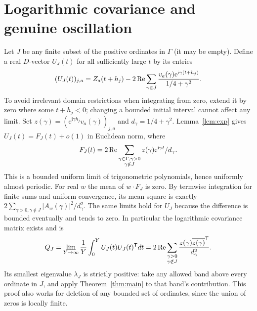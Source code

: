 \documentclass[11pt]{article}
\theoremstyle{remark}\newtheorem{remark}[theorem]{Remark}
\newcommand{\ii}{\mathrm i}\newcommand{\e}{\mathrm e}\newcommand{\ph}{\varphi}
\begin{document}
\section{Logarithmic covariance and genuine oscillation}
Let $J$ be any finite subset of the positive ordinates in $\Gamma$ (it may be empty). Define a real $D$-vector $U_J(t)$ for all sufficiently large $t$ by its entries
\[
 (U_J(t))_{j,a}=Z_a(t+h_j)-2\Rea\sum_{\gamma\in J}
      \frac{v_a(\gamma)\e^{\ii\gamma(t+h_j)}}{1/4+\gamma^2}.
\]
To avoid irrelevant domain restrictions when integrating from zero, extend it by zero where some $t+h_j<0$; changing a bounded initial interval cannot affect any limit. Set $z(\gamma)=(\e^{\ii\gamma h_j}v_a(\gamma))_{j,a}$ and $d_\gamma=1/4+\gamma^2$. Lemma~\ref{lem:exp} gives $U_J(t)=F_J(t)+o(1)$ in Euclidean norm, where
\[
 F_J(t)=2\Rea\sum_{\substack{\gamma\in\Gamma,\gamma>0\\\gamma\notin J}}
                  z(\gamma)\e^{\ii\gamma t}/d_\gamma.
\]
This is a bounded uniform limit of trigonometric polynomials, hence uniformly almost periodic. For real $w$ the mean of $w\cdot F_J$ is zero. By termwise integration for finite sums and uniform convergence, its mean square is exactly $2\sum_{\gamma>0,\gamma\notin J}|A_w(\gamma)|^2/d_\gamma^2$. The same limits hold for $U_J$ because the difference is bounded eventually and tends to zero. In particular the logarithmic covariance matrix exists and is
\begin{equation}\label{eq:cov}
 Q_J=\lim_{Y\to\infty}\frac1Y\int_0^Y U_J(t)U_J(t)^{\mathsf T}dt
 =2\operatorname{Re}\sum_{\substack{\gamma>0\\\gamma\notin J}}
             \frac{z(\gamma)\overline{z(\gamma)}^{\mathsf T}}{d_\gamma^2}.
\end{equation}
Its smallest eigenvalue $\lambda_J$ is strictly positive: take any allowed band above every ordinate in $J$, and apply Theorem~\ref{thm:main} to that band's contribution. This proof also works for deletion of any bounded set of ordinates, since the union of zeros is locally finite.
\end{document}
